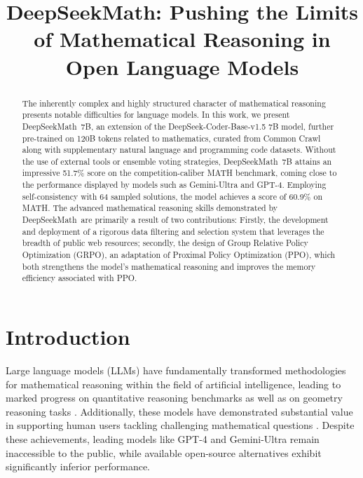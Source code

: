 \title{DeepSeekMath: Pushing the Limits of Mathematical Reasoning in Open Language Models}

\begin{abstract}
The inherently complex and highly structured character of mathematical reasoning presents notable difficulties for language models. In this work, we present DeepSeekMath~7B, an extension of the DeepSeek-Coder-Base-v1.5 7B model, further pre-trained on 120B tokens related to mathematics, curated from Common Crawl along with supplementary natural language and programming code datasets. Without the use of external tools or ensemble voting strategies, DeepSeekMath~7B attains an impressive 51.7\% score on the competition-caliber MATH benchmark, coming close to the performance displayed by models such as Gemini-Ultra and GPT-4. Employing self-consistency with 64 sampled solutions, the model achieves a score of 60.9\% on MATH. The advanced mathematical reasoning skills demonstrated by DeepSeekMath~are primarily a result of two contributions: Firstly, the development and deployment of a rigorous data filtering and selection system that leverages the breadth of public web resources; secondly, the design of Group Relative Policy Optimization (GRPO), an adaptation of Proximal Policy Optimization (PPO), which both strengthens the model’s mathematical reasoning and improves the memory efficiency associated with PPO.
\end{abstract}

\section{Introduction}

Large language models (LLMs) have fundamentally transformed methodologies for mathematical reasoning within the field of artificial intelligence, leading to marked progress on quantitative reasoning benchmarks \citep{MATH} as well as on geometry reasoning tasks \citep{trinh2024solving}. Additionally, these models have demonstrated substantial value in supporting human users tackling challenging mathematical questions \citep{tao}. Despite these achievements, leading models like GPT-4 \citep{gpt4} and Gemini-Ultra \citep{gemini} remain inaccessible to the public, while available open-source alternatives exhibit significantly inferior performance.

